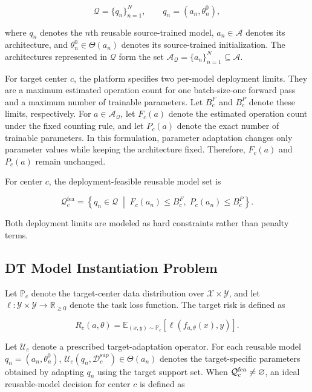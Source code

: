 \documentclass[a4paper,fleqn]{cas-sc}
\begin{document}
\begin{equation}
\mathcal{Q}=\{q_n\}_{n=1}^{N},
\qquad
q_n=(a_n,\theta_n^0),
\label{eq:reusable-models}
\end{equation}

where $q_n$ denotes the $n$th reusable source-trained model,
$a_n\in\mathcal{A}$ denotes its architecture, and
$\theta_n^0\in\Theta(a_n)$ denotes its source-trained initialization. The
architectures represented in $\mathcal{Q}$ form the set
$\mathcal{A}_{\mathcal{Q}}=\{a_n\}_{n=1}^{N}\subseteq\mathcal{A}$.

For target center $c$, the platform specifies two per-model deployment
limits. They are a maximum estimated operation count for one batch-size-one
forward pass and a maximum number of trainable parameters. Let $B_c^{F}$ and $B_c^{P}$
denote these limits, respectively. For $a\in\mathcal{A}_{\mathcal{Q}}$, let
$F_c(a)$ denote the estimated operation count under the fixed counting rule,
and let $P_c(a)$ denote the exact number of trainable parameters. In this
formulation, parameter adaptation changes only parameter values while keeping
the architecture fixed. Therefore, $F_c(a)$ and $P_c(a)$ remain unchanged.

For center $c$, the deployment-feasible reusable model set is

\begin{equation}
\mathcal{Q}_{c}^{\mathrm{fea}}
=
\left\{
q_n\in\mathcal{Q}
\;\middle|\;
F_c(a_n)\leq B_c^{F},
\;
P_c(a_n)\leq B_c^{P}
\right\}.
\label{eq:feasible-candidate-set}
\end{equation}

Both deployment limits are modeled as hard constraints rather than penalty
terms.

\subsection{DT Model Instantiation Problem}

Let $\mathbb{P}_c$ denote the target-center data distribution over
$\mathcal{X}\times\mathcal{Y}$, and let
$\ell:\mathcal{Y}\times\mathcal{Y}\rightarrow\mathbb{R}_{\geq 0}$ denote the
task loss function. The target risk is defined as

\begin{equation}
R_c(a,\theta)
=
\mathbb{E}_{(x,y)\sim\mathbb{P}_c}
\left[
\ell(f_{a,\theta}(x),y)
\right].
\label{eq:target-risk}
\end{equation}

Let $\mathcal{U}_c$ denote a prescribed target-adaptation operator. For each
reusable model $q_n=(a_n,\theta_n^0)$,
$\mathcal{U}_c(q_n,\mathcal{D}_c^{\mathrm{sup}})\in\Theta(a_n)$ denotes
the target-specific parameters obtained by adapting $q_n$ using the target
support set. When $\mathcal Q_c^{\rm fea}\ne\varnothing$, an ideal
reusable-model decision for center $c$ is defined as
\end{document}
